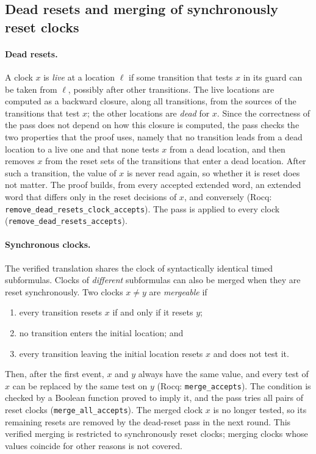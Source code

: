 \subsection{Dead resets and merging of synchronously reset clocks}
\label{sec:dead-merge}\label{sec:main-dead-merge}
\paragraph{Dead resets.}
A clock $x$ is \emph{live} at a location $\ell$ if some transition that tests
$x$ in its guard can be taken from $\ell$, possibly after other transitions.
The live locations are computed as a backward closure, along all
transitions, from the sources of the transitions that test $x$; the other
locations are \emph{dead} for $x$.  Since the correctness of the pass does
not depend on how this closure is computed, the pass checks the two
properties that the proof uses, namely that no transition leads from a dead
location to a live one and that none tests $x$ from a dead location, and then removes $x$ from the reset sets of the
transitions that enter a dead location.  After such a transition, the value of
$x$ is never read again, so whether it is reset does not matter.  The proof
builds, from every accepted extended word, an extended word that differs only
in the reset decisions of $x$, and conversely (Rocq:
\texttt{remove\_\allowbreak{}dead\_\allowbreak{}resets\_\allowbreak{}clock\_\allowbreak{}accepts}).  The pass is applied
to every clock (\texttt{remove\_\allowbreak{}dead\_\allowbreak{}resets\_\allowbreak{}accepts}).

\paragraph{Synchronous clocks.}
The verified translation shares the clock of syntactically identical timed
subformulas.  Clocks of \emph{different} subformulas can also be merged when
they are reset synchronously.  Two clocks $x\neq y$ are \emph{mergeable} if
\begin{enumerate}[label=(\roman*)]
  \item every transition resets $x$ if and only if it resets $y$;
  \item no transition enters the initial location; and
  \item every transition leaving the initial location resets $x$ and does not
        test it.
\end{enumerate}
Then, after the first event, $x$ and $y$ always have the same value, and every
test of $x$ can be replaced by the same test on $y$ (Rocq:
\texttt{merge\_\allowbreak{}accepts}).  The condition is checked by a Boolean function
proved to imply it, and the pass tries all pairs of reset clocks
(\texttt{merge\_\allowbreak{}all\_\allowbreak{}accepts}).  The merged clock $x$ is no longer tested,
so its remaining resets are removed by the dead-reset pass in the next round.
This verified merging is restricted to synchronously reset clocks; merging
clocks whose values coincide for other reasons is not covered.

